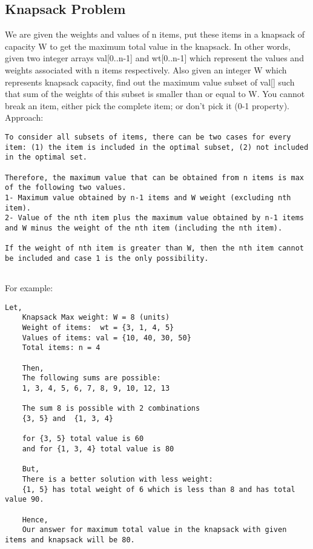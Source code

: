 \documentclass[12pt]{article}
\begin{document}
	\subsection{Knapsack Problem}
	We are given the weights and values of n items, put these items in a knapsack of capacity W to get the maximum total value in the knapsack. In other words, given two integer arrays val[0..n-1] and wt[0..n-1] which represent the values and weights associated with n items respectively. Also given an integer W which represents knapsack capacity, find out the maximum value subset of val[] such that sum of the weights of this subset is smaller than or equal to W. You cannot break an item, either pick the complete item; or don’t pick it (0-1 property).\\
    Approach:
	\begin{lstlisting}[numbers=none, frame=none]
To consider all subsets of items, there can be two cases for every item: (1) the item is included in the optimal subset, (2) not included in the optimal set.

Therefore, the maximum value that can be obtained from n items is max of the following two values.
1- Maximum value obtained by n-1 items and W weight (excluding nth item).
2- Value of the nth item plus the maximum value obtained by n-1 items and W minus the weight of the nth item (including the nth item).

If the weight of nth item is greater than W, then the nth item cannot be included and case 1 is the only possibility.
   
	\end{lstlisting}
	
	For example:
	\begin{lstlisting}[numbers=none, frame=none]
	Let,
	Knapsack Max weight: W = 8 (units)
    Weight of items:  wt = {3, 1, 4, 5}
    Values of items: val = {10, 40, 30, 50}
    Total items: n = 4
    
    Then,
    The following sums are possible:
    1, 3, 4, 5, 6, 7, 8, 9, 10, 12, 13
    
    The sum 8 is possible with 2 combinations
    {3, 5} and  {1, 3, 4}
    
    for {3, 5} total value is 60
    and for {1, 3, 4} total value is 80
    
    But,
    There is a better solution with less weight:
    {1, 5} has total weight of 6 which is less than 8 and has total value 90.
    
    Hence,
    Our answer for maximum total value in the knapsack with given items and knapsack will be 80.
    \end{lstlisting}
    \newpage
\end{document}
